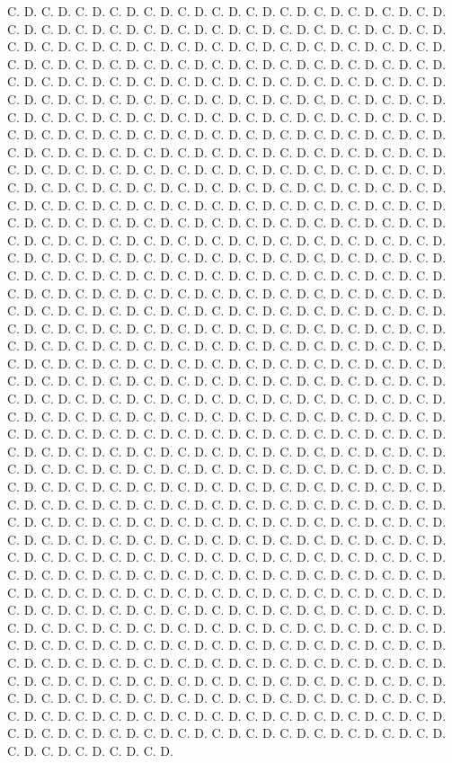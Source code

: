 \documentclass[12pt, a4paper]{report}
\begin{document}
\begin{thebibliography}{99}
C. D. C. D. C. D. C. D. C. D. C. D. C. D. C. D. C. D. C. D. C. D. C. D. C. D. C. D. C. D. C. D. C. D. C. D. C. D. C. D. C. D. C. D. C. D. C. D. C. D. C. D. C. D. C. D. C. D. C. D. C. D. C. D. C. D. C. D. C. D. C. D. C. D. C. D. C. D. C. D. C. D. C. D. C. D. C. D. C. D. C. D. C. D. C. D. C. D. C. D. C. D. C. D. C. D. C. D. C. D. C. D. C. D. C. D. C. D. C. D. C. D. C. D. C. D. C. D. C. D. C. D. C. D. C. D. C. D. C. D. C. D. C. D. C. D. C. D. C. D. C. D. C. D. C. D. C. D. C. D. C. D. C. D. C. D. C. D. C. D. C. D. C. D. C. D. C. D. C. D. C. D. C. D. C. D. C. D. C. D. C. D. C. D. C. D. C. D. C. D. C. D. C. D. C. D. C. D. C. D. C. D. C. D. C. D. C. D. C. D. C. D. C. D. C. D. C. D. C. D. C. D. C. D. C. D. C. D. C. D. C. D. C. D. C. D. C. D. C. D. C. D. C. D. C. D. C. D. C. D. C. D. C. D. C. D. C. D. C. D. C. D. C. D. C. D. C. D. C. D. C. D. C. D. C. D. C. D. C. D. C. D. C. D. C. D. C. D. C. D. C. D. C. D. C. D. C. D. C. D. C. D. C. D. C. D. C. D. C. D. C. D. C. D. C. D. C. D. C. D. C. D. C. D. C. D. C. D. C. D. C. D. C. D. C. D. C. D. C. D. C. D. C. D. C. D. C. D. C. D. C. D. C. D. C. D. C. D. C. D. C. D. C. D. C. D. C. D. C. D. C. D. C. D. C. D. C. D. C. D. C. D. C. D. C. D. C. D. C. D. C. D. C. D. C. D. C. D. C. D. C. D. C. D. C. D. C. D. C. D. C. D. C. D. C. D. C. D. C. D. C. D. C. D. C. D. C. D. C. D. C. D. C. D. C. D. C. D. C. D. C. D. C. D. C. D. C. D. C. D. C. D. C. D. C. D. C. D. C. D. C. D. C. D. C. D. C. D. C. D. C. D. C. D. C. D. C. D. C. D. C. D. C. D. C. D. C. D. C. D. C. D. C. D. C. D. C. D. C. D. C. D. C. D. C. D. C. D. C. D. C. D. C. D. C. D. C. D. C. D. C. D. C. D. C. D. C. D. C. D. C. D. C. D. C. D. C. D. C. D. C. D. C. D. C. D. C. D. C. D. C. D. C. D. C. D. C. D. C. D. C. D. C. D. C. D. C. D. C. D. C. D. C. D. C. D. C. D. C. D. C. D. C. D. C. D. C. D. C. D. C. D. C. D. C. D. C. D. C. D. C. D. C. D. C. D. C. D. C. D. C. D. C. D. C. D. C. D. C. D. C. D. C. D. C. D. C. D. C. D. C. D. C. D. C. D. C. D. C. D. C. D. C. D. C. D. C. D. C. D. C. D. C. D. C. D. C. D. C. D. C. D. C. D. C. D. C. D. C. D. C. D. C. D. C. D. C. D. C. D. C. D. C. D. C. D. C. D. C. D. C. D. C. D. C. D. C. D. C. D. C. D. C. D. C. D. C. D. C. D. C. D. C. D. C. D. C. D. C. D. C. D. C. D. C. D. C. D. C. D. C. D. C. D. C. D. C. D. C. D. C. D. C. D. C. D. C. D. C. D. C. D. C. D. C. D. C. D. C. D. C. D. C. D. C. D. C. D. C. D. C. D. C. D. C. D. C. D. C. D. C. D. C. D. C. D. C. D. C. D. C. D. C. D. C. D. C. D. C. D. C. D. C. D. C. D. C. D. C. D. C. D. C. D. C. D. C. D. C. D. C. D. C. D. C. D. C. D. C. D. C. D. C. D. C. D. C. D. C. D. C. D. C. D. C. D. C. D. C. D. C. D. C. D. C. D. C. D. C. D. C. D. C. D. C. D. C. D. C. D. C. D. C. D. C. D. C. D. C. D. C. D. C. D. C. D. C. D. C. D. C. D. C. D. C. D. C. D. C. D. C. D. C. D. C. D. C. D. C. D. C. D. C. D. C. D. C. D. C. D. C. D. C. D. C. D. C. D. C. D. C. D. C. D. C. D. C. D. C. D. C. D. C. D. C. D. C. D. C. D. C. D. C. D. C. D. C. D. C. D. C. D. C. D. C. D. C. D. C. D. C. D. C. D. C. D. C. D. C. D. C. D. C. D. C. D. C. D. C. D. C. D. C. D. C. D. C. D. C. D. C. D. C. D. C. D. C. D. C. D. C. D. C. D. C. D. C. D. C. D. C. D. C. D. C. D. C. D. C. D. C. D. C. D. C. D. C. D. C. D. C. D. C. D. C. D. C. D. C. D. C. D. C. D. C. D. C. D. C. D. C. D. C. D. C. D. C. D. C. D. C. D. C. D. C. D. C. D. C. D. C. D. C. D. C. D. C. D. C. D. C. D. 
\end{thebibliography}
\end{document}
